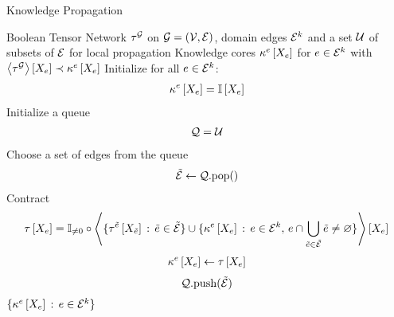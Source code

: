 \begin{algorithm}[hbt!]
    \caption{Knowledge Propagation}\label{alg:knowledgePropagation}
    \begin{algorithmic}
        \Require Boolean Tensor Network $\tau^{\mathcal{G}}$ on $\mathcal{G}=(\mathcal{V},\mathcal{E})$, domain edges $\mathcal{E}^{k}$ and a set $\mathcal{U}$ of subsets of $\mathcal{E}$ for local propagation
        \Ensure Knowledge cores $\kappa^{e}\left[X_{e}\right]$ for $e\in\mathcal{E}^{k}$ with $\left\langle \tau^{\mathcal{G}}\right\rangle \left[ X_{e} \right]\prec\kappa^{e}\left[X_{e}\right]$
        \iosepline
        \State
        \State Initialize for all $e\in\mathcal{E}^{k}$:
        \begin{align*}
            \kappa^{e}\left[X_{e}\right]=\mathbb{I}\left[X_{e}\right]
        \end{align*}
        \State Initialize a queue
        \begin{align*}
            \mathcal{Q} = \mathcal{U}
        \end{align*}
            \State Choose a set of edges from the queue
            \begin{align*}
                \tilde{\mathcal{E}} \leftarrow \mathcal{Q}\mathrm{.pop()}
            \end{align*}
                \State Contract
                \begin{align*}
                    \tau\left[X_{e}\right]
                    = \mathbb{I}_{\neq0}\circ\left\langle 
                        \{\tau^{\tilde{e}}\left[X_{\tilde{e}}\right]\,:\,\tilde{e}\in\tilde{\mathcal{E}}\}
                        \cup \{\kappa^{e}\left[X_{e}\right]\,:\,e \in \mathcal{E}^{k} , \, e\cap\bigcup_{\tilde{e}\in\tilde{\mathcal{E}}}\tilde{e}\neq\varnothing \}
                    \right\rangle \left[ X_{e} \right]
                \end{align*}
                \If{$\hypercoreat{\catvariableof{\edge}}\neq\kcoreofat{\edge}{\catvariableof{\edge}}$}
                    \begin{align*}
                        \kappa^{e}\left[X_{e}\right] \leftarrow \tau\left[X_{e}\right]
                    \end{align*}
                        \begin{align*}
                            \mathcal{Q}\mathrm{.push(}\tilde{\mathcal{E}}\mathrm{)}
                        \end{align*}
                    \EndFor
                \EndIf
            \EndFor
        \EndWhile
        \State \Return $\{\kappa^{e}\left[X_{e}\right]\,:\,e\in\mathcal{E}^{k}\}$
    \end{algorithmic}
\end{algorithm}

